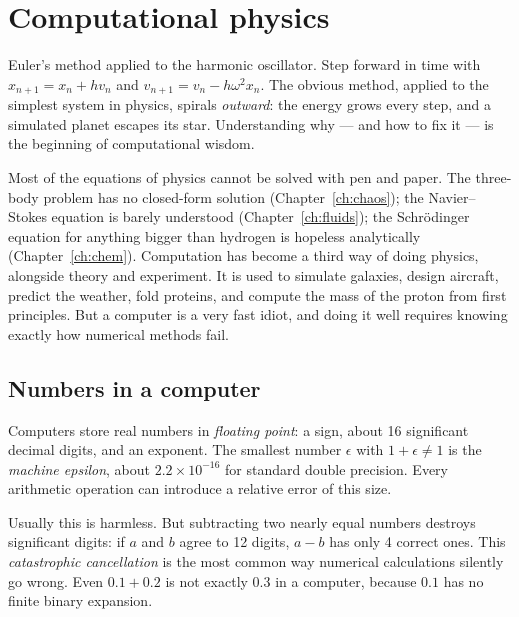\chapter{Computational physics}
\label{ch:comp}



\begin{prototype}
Euler's method applied to the harmonic oscillator. Step forward in time with $x_{n+1} = x_n + hv_n$ and $v_{n+1} = v_n - h\omega^2x_n$. The obvious method, applied to the simplest system in physics, spirals \emph{outward}: the energy grows every step, and a simulated planet escapes its star. Understanding why --- and how to fix it --- is the beginning of computational wisdom.
\end{prototype}

Most of the equations of physics cannot be solved with pen and paper. The three-body problem has no closed-form solution (Chapter~\ref{ch:chaos}); the Navier--Stokes equation is barely understood (Chapter~\ref{ch:fluids}); the Schr\"odinger equation for anything bigger than hydrogen is hopeless analytically (Chapter~\ref{ch:chem}). Computation has become a third way of doing physics, alongside theory and experiment. It is used to simulate galaxies, design aircraft, predict the weather, fold proteins, and compute the mass of the proton from first principles. But a computer is a very fast idiot, and doing it well requires knowing exactly how numerical methods fail.

\section{Numbers in a computer}

Computers store real numbers in \emph{floating point}: a sign, about 16 significant decimal digits, and an exponent. The smallest number $\epsilon$ with $1 + \epsilon\ne1$ is the \emph{machine epsilon}, about $2.2\times10^{-16}$ for standard double precision. Every arithmetic operation can introduce a relative error of this size.

Usually this is harmless. But subtracting two nearly equal numbers destroys significant digits: if $a$ and $b$ agree to 12 digits, $a-b$ has only 4 correct ones. This \emph{catastrophic cancellation} is the most common way numerical calculations silently go wrong. Even $0.1+0.2$ is not exactly $0.3$ in a computer, because $0.1$ has no finite binary expansion.

